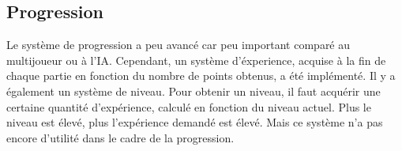 \subsection{Progression}
	Le système de progression a peu avancé car peu important comparé au multijoueur ou à l'IA.
	Cependant, un système d'éxperience, acquise à la fin de chaque partie en fonction du nombre de
	points obtenus, a été implémenté. Il y a également un système de niveau. Pour obtenir un niveau, il faut
	acquérir une certaine quantité d'expérience, calculé en fonction du niveau actuel. Plus le niveau est élevé,
	plus l'expérience demandé est élevé. Mais ce système n'a pas encore d'utilité dans le cadre de la progression.
